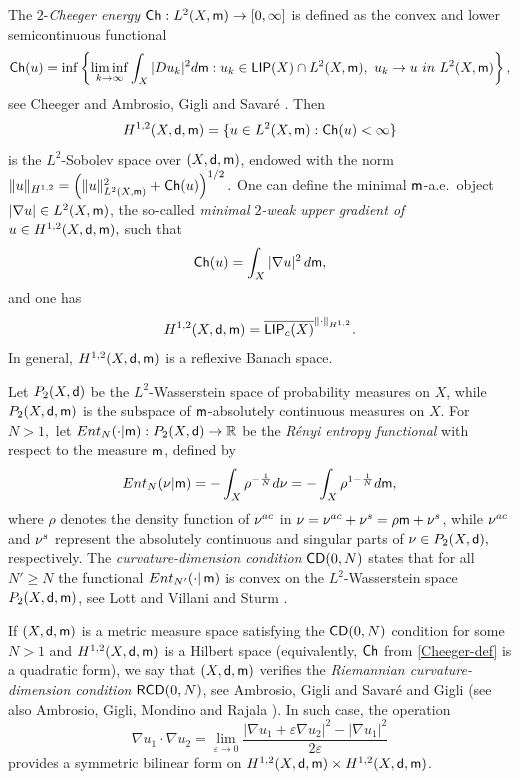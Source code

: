 \documentclass[11pt, reqno]{amsart}
\numberwithin{equation}{section}
\begin{document}
	 The $2$-\textit{Cheeger energy} ${\sf Ch}:L^2(X,{\sf m})\to [0,\infty]$ is defined as the convex and lower semicontinuous functional 
	\begin{equation}\label{Cheeger-def}
		{\sf Ch}(u)=\inf\left\{\liminf_{k\to \infty} \int_X |D u_k|^2 {\rm d} {\sf m}:u_k\in {\sf LIP}(X)\cap L^2(X,{\sf m}),\ u_k\to u\ {\rm in}\ L^2(X,{\sf m})  \right\},
	\end{equation}
	see  Cheeger \cite{Cheeger} and Ambrosio,  Gigli and Savar\'e \cite{AGS}.
	Then  $$H^{ 1,2}(X,{\sf d},{\sf m})=\{u\in L^2(X,{\sf m}):{\sf Ch}(u)<\infty\}$$ is  the $L^2$-Sobolev space over $(X,{\sf d}, {\sf m})$, endowed with the norm 
	$\|u\|_{H^{ 1,2}}=\left(\|u\|^2_{L^2(X,{\sf m})}+{\sf Ch}(u)\right)^{1/2}. $
	One can define the minimal $ {\sf m}$-a.e.\ object $|\nabla u | \in  L^2(X, {\sf m})$, the so-called  \textit{minimal $2$-weak upper gradient of} $u \in H^{ 1,2}(X,{\sf d},{\sf m}),$ such that 
	$${\sf Ch}(u)= \int_X |\nabla u|^2\, {\rm d} {\sf m},$$
	and one has \begin{equation}\label{Sobolev-second-definition}
		H^{ 1,2}(X,{\sf d},{\sf m})=\overline{{\sf LIP}_c(X)}^{\|\cdot\|_{H^{ 1,2}}}.
	\end{equation}
	In general,  $H^{ 1,2}(X,{\sf d},{\sf m})$ is a reflexive Banach space. 
	
		Let	$P_2(X,{\sf d})$ be the
	$L^2$-Wasserstein space of probability measures on $X$, while
	$P_2(X,{\sf d}, {\sf m})$ is  the subspace of
	$ {\sf m}$-absolutely continuous measures on $X$.
	For  $N> 1,$ let 
	${\rm Ent}_N(\cdot| {\sf m}):P_2(X,{\sf d})\to \mathbb R$ be  
	the {\it R\'enyi entropy functional} with
	respect to the measure $ {\sf m}$, defined by 
	\begin{equation}\label{entropy}
		{\rm Ent}_N(\nu| {\sf m})=-\int_X \rho^{-\frac{1}{N}}{\rm d}\nu=-\int_X \rho^{1-\frac{1}{N}}{\rm d} {\sf m},
	\end{equation}
	where $\rho$ denotes the density function of $\nu^{\rm ac}$ in
	$\nu=\nu^{\rm ac}+\nu^{\rm s}=\rho  {\sf m}+\nu^{\rm s}$, while $\nu^{\rm ac}$ and $\nu^{\rm s}$
	represent the absolutely continuous and singular parts of $\nu\in
	P_2(X,{\sf d}),$ respectively.
	The \textit{curvature-dimension condition} ${\sf CD}(0,N)$
	states that for all $N'\geq N$ the functional ${\rm Ent}_{N'}(\cdot|\,{\sf m})$ is
	convex on the $L^2$-Wasserstein space $P_2(X, {\sf d}, {\sf m})$, see Lott and Villani \cite{LV} and Sturm \cite{Sturm-2}.
	
	
	 If $(X,{\sf d}, {\sf m})$ is a metric measure space satisfying the ${\sf CD}(0,N)$ condition for some $N>1$ and $H^{ 1,2}(X,{\sf d},{\sf m})$
	is a Hilbert space (equivalently, ${\sf Ch}$ from \eqref{Cheeger-def} is a  quadratic form), we say that $(X,{\sf d},{\sf m})$  verifies the \textit{Riemannian curvature-dimension
		condition} ${\sf RCD}(0,N)$, see Ambrosio, Gigli and Savar\'e \cite{AGS2} and Gigli \cite{Gigli1} (see also Ambrosio,  Gigli,  Mondino and Rajala \cite{AGMR}).  In such case, the operation
	$$\nabla u_1 \cdot \nabla u_2=\lim_{\varepsilon\to 0}\frac{|\nabla u_1 +\varepsilon \nabla u_2|^2-|\nabla u_1|^2}{2\varepsilon}$$
	provides a symmetric bilinear form on $H^{ 1,2}(X,{\sf d},{\sf m})\times H^{ 1,2}(X,{\sf d},{\sf m})$.
	
\end{document}

